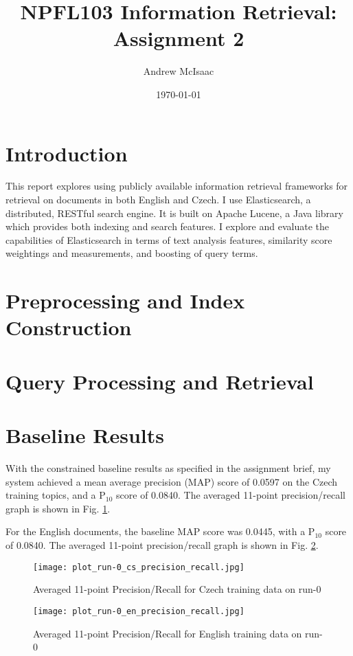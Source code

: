 \documentclass[a4paper]{article}
\title{NPFL103 Information Retrieval: Assignment 2}
\date{\today}
\author{Andrew McIsaac}
\begin{document}
\maketitle

\section{Introduction}
This report explores using publicly available information retrieval frameworks
for retrieval on documents in both English and Czech. I use Elasticsearch, a
distributed, RESTful search engine. It is built on Apache Lucene, a Java library
which provides both indexing and search features. I explore and evaluate the
capabilities of Elasticsearch in terms of text analysis features, similarity
score weightings and measurements, and boosting of query terms.

\section{Preprocessing and Index Construction}

\section{Query Processing and Retrieval}

\section{Baseline Results}
With the constrained baseline results as specified in the assignment brief, my
system achieved a mean average precision (MAP) score of 0.0597 on the Czech
training topics, and a P$_{10}$ score of 0.0840. The averaged 11-point
precision/recall graph is shown in Fig. \ref{fig:cs_train}.

For the English documents, the baseline MAP score was 0.0445, with a P$_{10}$
score of 0.0840. The averaged 11-point precision/recall graph is shown in Fig.
\ref{fig:en_train}.

\begin{figure}[htpb]
	\centering
	\texttt{[image: plot\_run-0\_cs\_precision\_recall.jpg]}
	\caption{Averaged 11-point Precision/Recall for Czech training data on run-0}
	\label{fig:cs_train}
\end{figure}

\begin{figure}[htpb]
	\centering
	\texttt{[image: plot\_run-0\_en\_precision\_recall.jpg]}
	\caption{Averaged 11-point Precision/Recall for English training data on run-0}
	\label{fig:en_train}
\end{figure}
\end{document}
